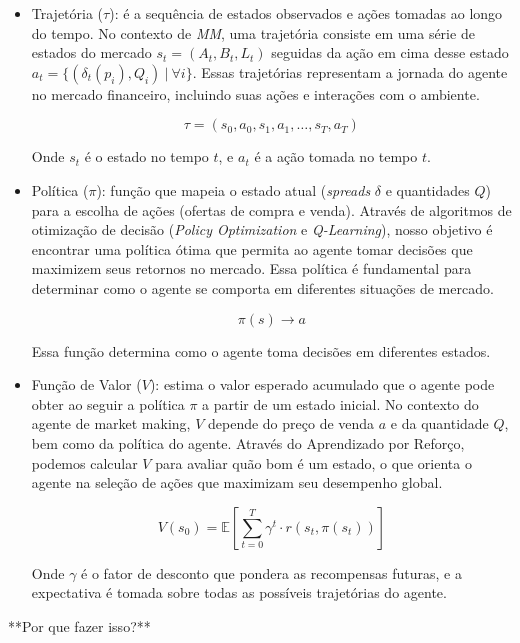 \begin{itemize}
	\item Trajetória ($\tau$): é a sequência de estados observados e ações tomadas ao longo do tempo. No contexto de \textit{MM}, uma trajetória consiste em uma série de estados do mercado $s_{t} = (A_{t}, B_{t}, L_{t})$ seguidas da ação em cima desse estado $a_{t} = \{(\delta_{t}(p_{i}), Q_{i}) \ | \ \forall i \}$. Essas trajetórias representam a jornada do agente no mercado financeiro, incluindo suas ações e interações com o ambiente.
	
	\[
	\tau = (s_0, a_0, s_1, a_1, \ldots, s_T, a_T)
	\]
	
	Onde \(s_t\) é o estado no tempo \(t\), e \(a_t\) é a ação tomada no tempo \(t\).
	
	\item Política ($\pi$): função que mapeia o estado atual (\textit{spreads} $\delta$ e quantidades $Q$) para a escolha de ações (ofertas de compra e venda). Através de algoritmos de otimização de decisão (\textit{Policy Optimization} e \textit{Q-Learning}), nosso objetivo é encontrar uma política ótima que permita ao agente tomar decisões que maximizem seus retornos no mercado. Essa política é fundamental para determinar como o agente se comporta em diferentes situações de mercado.
	
	\[
	\pi(s) \rightarrow a
	\]
	
	Essa função determina como o agente toma decisões em diferentes estados.
	
	\item Função de Valor ($V$): estima o valor esperado acumulado que o agente pode obter ao seguir a política \(\pi\) a partir de um estado inicial. No contexto do agente de market making, \(V\) depende do preço de venda \(a\) e da quantidade \(Q\), bem como da política do agente. Através do Aprendizado por Reforço, podemos calcular \(V\) para avaliar quão bom é um estado, o que orienta o agente na seleção de ações que maximizam seu desempenho global.
	
	\begin{equation*}
		V(s_0) = \mathbb{E}\left[\sum_{t=0}^{T} \gamma^t \cdot r(s_t, \pi(s_t)) \right]
		\end{equation*}
		
	Onde \(\gamma\) é o fator de desconto que pondera as recompensas futuras, e a expectativa é tomada sobre todas as possíveis trajetórias do agente.
\end{itemize}


**Por que fazer isso?**

